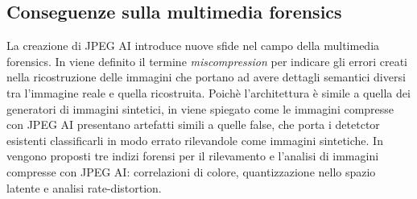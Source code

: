 \subsection{Conseguenze sulla multimedia forensics}
La creazione di JPEG AI introduce nuove sfide nel campo della multimedia forensics. In \cite{hofer2024taxonomy} viene definito il termine \textit{miscompression} per indicare gli errori creati nella ricostruzione delle immagini che portano ad avere dettagli semantici diversi tra l'immagine reale e quella ricostruita.
Poichè l'architettura è simile a quella dei generatori di immagini sintetici, in \cite{cannas2024jpeg} viene spiegato come le immagini compresse con JPEG AI presentano artefatti simili a quelle false, che porta i detetctor esistenti classificarli in modo errato rilevandole come immagini sintetiche.
In \cite{bergmann2025three} vengono proposti tre indizi forensi per il rilevamento e l'analisi di immagini compresse con JPEG AI: correlazioni di colore, quantizzazione nello spazio latente e analisi rate-distortion.

